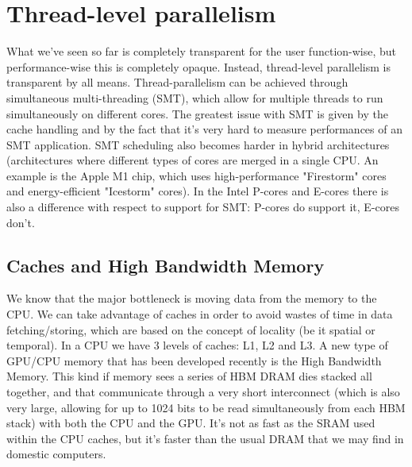 \section{Thread-level parallelism}

What we've seen so far is completely transparent for the user function-wise, but performance-wise this is completely opaque. Instead, thread-level parallelism is transparent by all means. 
\nwl
Thread-parallelism can be achieved through simultaneous multi-threading (SMT), which allow for multiple threads to run simultaneously on different cores. The greatest issue with SMT is given by the cache handling and by the fact that it's very hard to measure performances of an SMT application.
\nwl
SMT scheduling also becomes harder in hybrid architectures (architectures where different types of cores are merged in a single CPU. An example is the Apple M1 chip, which uses high-performance "Firestorm" cores and energy-efficient "Icestorm" cores). In the Intel P-cores and E-cores there is also a difference with respect to support for SMT: P-cores do support it, E-cores don't.

\subsection{Caches and High Bandwidth Memory}

We know that the major bottleneck is moving data from the memory to the CPU. We can take advantage of caches in order to avoid wastes of time in data fetching/storing, which are based on the concept of locality (be it spatial or temporal). In a CPU we have 3 levels of caches: L1, L2 and L3.
\nwl
A new type of GPU/CPU memory that has been developed recently is the High Bandwidth Memory. This kind if memory sees a series of HBM DRAM dies stacked all together, and that communicate through a very short interconnect (which is also very large, allowing for up to 1024 bits to be read simultaneously from each HBM stack) with both the CPU and the GPU. It's not as fast as the SRAM used within the CPU caches, but it's faster than the usual DRAM that we may find in domestic computers.